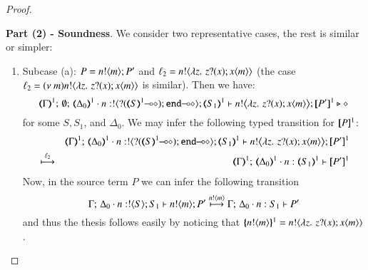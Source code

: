 \begin{proof}
\begin{enumerate}[1.]

%
		
\end{enumerate}
%
\noi \textbf{Part (2) - Soundness}. We consider two representative cases, the rest is similar or simpler:
%
\begin{enumerate}[1.]
	\item Subcase (a): $P = n ! \langle m \rangle ; P'$ and $\ell_2 = n ! \langle \lambda z.\,\,z ? (x) ; x\langle m \rangle \rangle$
	(the case $\ell_2 = (\nu\ m)n ! \langle \lambda z.\,\,z ? (x) ; x\langle m \rangle \rangle$ is similar).
		Then 
		we have: %
%
		\[
			\mapt{\Gamma}^{1};\, \emptyset;\, \mapt{\Delta_0}^{1} \cat 
			n: \btout{\lhot{\btinp{\lhot{\tmap{S}{1}}}\tinact}} \tmap{S_1}{1} 
			\proves 
			 \bbout{n}{ \abs{z}{\,\binp{z}{x} \appl{x}{m}} } \pmap{P'}{1} 
			 \hastype \Proc
		\]
%
		for some $S, S_1$, and $\Delta_0$. 
		We may infer the following typed transition for $[\!\![P]\!\!]^{1}$:
%
		\begin{eqnarray*}
			& & \mapt{\Gamma}^{1};\, \mapt{\Delta_0}^{1} \cat n: \btout{\lhot{\btinp{\lhot{\tmap{S}{1}}}\tinact}} \tmap{S_1}{1} 
			\proves 
			 \bbout{n}{ \abs{z}{\,\binp{z}{x} \appl{x}{m}} } \pmap{P'}{1} 
			 \\
			&\hby{\ell_2}& 
			\mapt{\Gamma}^{1};\, \mapt{\Delta_0}^{1} \cat n: \tmap{S_1}{1} 
			\proves  \pmap{P'}{1} 
		\end{eqnarray*}
%
		Now, in the source term $P$ we can infer the following transition 
%
		\[
		\Gamma;\,  \Delta_0 \cdot n:! \langle S \rangle ; S_1 \vdash n ! \langle m \rangle ; P'
		 \stackrel{n ! \langle m \rangle}{\longmapsto} 
		 \Gamma;\,  \Delta_0 \cdot n: S_1 \vdash P'
		\]
%
		and thus the thesis follows easily by noticing that 
		$\{\!\!\{n ! \langle m \rangle\}\!\!\}^{1} = n ! \langle \lambda z.\,\,z ? (x) ; x\langle m \rangle \rangle$.



\end{enumerate}
\end{proof}
